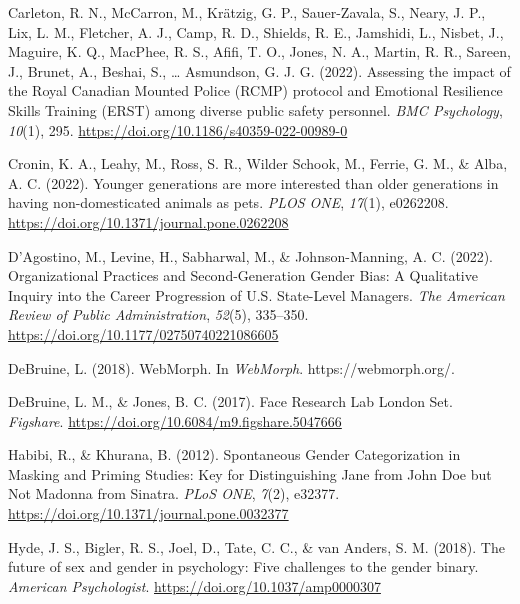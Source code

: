 \documentclass[
  man,
  longtable,
  nolmodern,
  notxfonts,
  notimes,
  colorlinks=true,linkcolor=blue,citecolor=blue,urlcolor=blue]{apa7}
\newlength{\cslhangindent}
\newenvironment{CSLReferences}[2] %
 {\begin{list}{}{%
  \setlength{\itemindent}{0pt}
  \setlength{\leftmargin}{0pt}
  \setlength{\parsep}{0pt}
  \ifodd #1
   \setlength{\leftmargin}{\cslhangindent}
   \setlength{\itemindent}{-1\cslhangindent}
  \fi
  \setlength{\itemsep}{#2\baselineskip}}}
 {\end{list}}
\begin{document}
\begin{CSLReferences}{1}{0}
Carleton, R. N., McCarron, M., Krätzig, G. P., Sauer-Zavala, S., Neary,
J. P., Lix, L. M., Fletcher, A. J., Camp, R. D., Shields, R. E.,
Jamshidi, L., Nisbet, J., Maguire, K. Q., MacPhee, R. S., Afifi, T. O.,
Jones, N. A., Martin, R. R., Sareen, J., Brunet, A., Beshai, S.,
\ldots{} Asmundson, G. J. G. (2022). Assessing the impact of the {Royal
Canadian Mounted Police} ({RCMP}) protocol and {Emotional Resilience
Skills Training} ({ERST}) among diverse public safety personnel.
\emph{BMC Psychology}, \emph{10}(1), 295.
\url{https://doi.org/10.1186/s40359-022-00989-0}

Cronin, K. A., Leahy, M., Ross, S. R., Wilder Schook, M., Ferrie, G. M.,
\& Alba, A. C. (2022). Younger generations are more interested than
older generations in having non-domesticated animals as pets. \emph{PLOS
ONE}, \emph{17}(1), e0262208.
\url{https://doi.org/10.1371/journal.pone.0262208}

D'Agostino, M., Levine, H., Sabharwal, M., \& Johnson-Manning, A. C.
(2022). Organizational {Practices} and {Second-Generation Gender Bias}:
{A Qualitative Inquiry} into the {Career Progression} of {U}.{S}.
{State-Level Managers}. \emph{The American Review of Public
Administration}, \emph{52}(5), 335--350.
\url{https://doi.org/10.1177/02750740221086605}

DeBruine, L. (2018). {WebMorph}. In \emph{WebMorph}.
https://webmorph.org/.

DeBruine, L. M., \& Jones, B. C. (2017). Face {Research Lab London Set}.
\emph{Figshare}. \url{https://doi.org/10.6084/m9.figshare.5047666}

Habibi, R., \& Khurana, B. (2012). Spontaneous {Gender Categorization}
in {Masking} and {Priming Studies}: {Key} for {Distinguishing Jane} from
{John Doe} but {Not Madonna} from {Sinatra}. \emph{PLoS ONE},
\emph{7}(2), e32377. \url{https://doi.org/10.1371/journal.pone.0032377}

Hyde, J. S., Bigler, R. S., Joel, D., Tate, C. C., \& van Anders, S. M.
(2018). The future of sex and gender in psychology: {Five} challenges to
the gender binary. \emph{American Psychologist}.
\url{https://doi.org/10.1037/amp0000307}


\end{CSLReferences}
\end{document}
